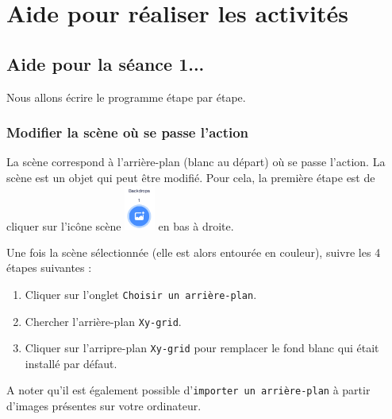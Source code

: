 \newpage





%
%
%
%



\section{Aide pour réaliser les activités}

\subsection{Aide pour la séance 1...}\label{correction_scratch1}




Nous allons écrire le programme étape par étape.


\subsubsection{Modifier la scène où se passe l'action}

La scène correspond à l'arrière-plan (blanc au départ) où se passe l'action. La scène est un objet qui peut être modifié. Pour cela, la première étape est de cliquer sur l'icône scène \includegraphics[width=1cm]{./images/scratch/changerScene} en bas à droite.


Une fois la scène sélectionnée (elle est alors entourée en couleur), suivre les 4 étapes suivantes :

\begin{enumerate}
\item Cliquer sur l'onglet \texttt{Choisir un arrière-plan}.
\item Chercher l'arrière-plan \texttt{Xy-grid}.
\item Cliquer sur l'arripre-plan \texttt{Xy-grid} pour remplacer le fond blanc qui était installé par défaut. 
\end{enumerate}

A noter qu'il est également possible d'\texttt{importer un arrière-plan} à partir d'images présentes sur votre ordinateur.

